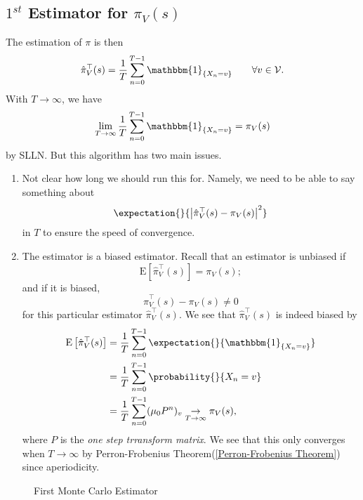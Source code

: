 \subsection{\(1^{st}\) Estimator for \(\pi_V(s)\)}
The estimation of \(\pi\) is then
\[
	\hat{\pi}^{\top}_{V}(s) = \frac{1}{T}\sum\limits_{n=0}^{T-1} \mathbbm{1}_{\{X_n = v\}}\qquad \forall v\in \mathcal{V}.
\]
With \(T\to \infty \), we have
\[
	\lim_{T\to \infty}\frac{1}{T} \sum\limits_{n=0}^{T-1} \mathbbm{1}_{\{X_n = v\}} = \pi_V(s)
\]
by SLLN. But this algorithm has two main issues.
\begin{enumerate}
	\item Not clear how long we should run this for. Namely, we need to be able to say something about
	      \[
		      \expectation{}{\left\vert \hat{\pi}^{\top}_V(s) - \pi_V(s) \right\vert^2 }
	      \]
	      in \(T\) to ensure the speed of convergence.
	\item The estimator is a biased estimator. Recall that an estimator is unbiased if
	      \[
		      \mathrm{E}\left[ \hat{\pi}_{V}^{\top}(s) \right] = \pi_V(s);
	      \]
	      and if it is biased,
	      \[
		      \hat{\pi}_{V}^{\top}(s) - \pi_V(s)\neq 0
	      \]
	      for this particular estimator \(\hat{\pi}^{\top}_V(s)\). We see that \(\hat{\pi}^{\top}_V(s)\) is indeed biased by
	      \[
		      \begin{split}
			      \mathrm{E}\left[\hat{\pi}^{\top}_V(s)\right] &= \frac{1}{T}\sum\limits_{n=0}^{T-1} \expectation{}{\mathbbm{1}_{\{X_n = v\}}}\\
			      &= \frac{1}{T}\sum\limits_{n=0}^{T-1} \probability{}{X_n = v} \\
			      &= \frac{1}{T}\sum\limits_{n=0}^{T-1} (\mu_0 P^n)_v\underset{T\to \infty }{\to }\pi_V(s),
		      \end{split}
	      \]
	      where \(P\) is the \emph{one step trransform matrix}. We see that this only converges when \(T\to \infty \) by Perron-Frobenius Theorem(\autoref{Perron-Frobenius Theorem})
	      since aperiodicity.
\end{enumerate}

\begin{figure}[H]
	\centering
	\caption{First Monte Carlo Estimator}
	\label{fig:Monte-Carlo-Estimator-1}
\end{figure}

